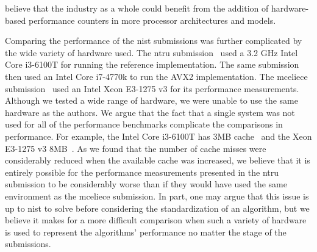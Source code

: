 believe that the industry as a whole could benefit from the addition of hardware-based performance counters in more processor architectures and models.

Comparing the performance of the \gls{nist} submissions was further complicated by the wide variety of hardware used. The \gls{ntru} submission~\cite{ntru2020} used a 3.2 GHz Intel Core i3-6100T for running the reference implementation. The same submission then used an Intel Core i7-4770k to run the AVX2 implementation. The \gls{mceliece} submission~\cite{mceliece2020} used an Intel Xeon E3-1275 v3 for its performance measurements. Although we tested a wide range of hardware, we were unable to use the same hardware as the authors. We argue that the fact that a single system was not used for all of the performance benchmarks complicate the comparisons in performance. For example, the Intel Core i3-6100T has 3MB cache~\cite{i36100t} and the Xeon E3-1275 v3 8MB~\cite{xeon31275}. As we found that the number of cache misses were considerably reduced when the available cache was increased, we believe that it is entirely possible for the performance measurements presented in the \gls{ntru} submission to be considerably worse than if they would have used the same environment as the \gls{mceliece} submission. In part, one may argue that this issue is up to \gls{nist} to solve before considering the standardization of an algorithm, but we believe it makes for a more difficult comparison when such a variety of hardware is used to represent the algorithms' performance no matter the stage of the submissions.


